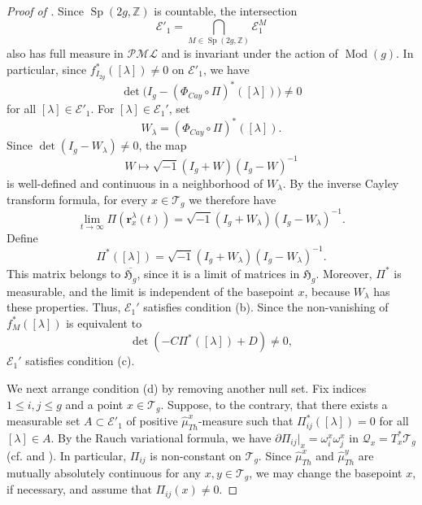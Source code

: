 \documentclass[dvipdfmx]{amsart}
\theoremstyle{remark}
\newcommand{\teich}{\mathcal{T}}
\newcommand{\tmod}{\operatorname{Mod}}
\newcommand{\PThursM}{\hat{\mu}_{Th}}
\newcommand{\ray}{{\boldsymbol r}}
\newcommand{\pml}{\mathcal{PML}}
\newcommand{\syp}{\mathop{Sp}}
\newcommand{\Cayley}{\Phi_{C\!a\!y}}
\begin{document}
\begin{proof}[Proof of ]
Since $\syp(2g,\mathbb{Z})$ is countable, the intersection
\[
\mathcal{E}'_1
=
\bigcap_{M\in \syp(2g,\mathbb{Z})}\mathcal{E}_1^M
\]
also has full measure in $\pml$ and is invariant under the action of $\tmod(g)$.
In particular, since $f_{I_{2g}}^*([\lambda])\ne 0$ on $\mathcal{E}'_1$, we have
\[
\det\bigl(I_g-(\Cayley\circ\Pi)^*([\lambda])\bigr)\ne 0
\]
for all $[\lambda]\in \mathcal{E}'_1$.
For $[\lambda]\in\mathcal{E}_1'$, set
\[
W_\lambda=(\Cayley\circ\Pi)^*([\lambda]).
\]
Since $\det(I_g-W_\lambda)\ne0$, the map
\[
W\longmapsto
\sqrt{-1}(I_g+W)(I_g-W)^{-1}
\]
is well-defined and continuous in a neighborhood of $W_\lambda$.
By the inverse Cayley transform formula, for every
$x\in\teich_g$ we therefore have
\[
\lim_{t\to\infty}\Pi(\ray^\lambda_x(t))
=
\sqrt{-1}(I_g+W_\lambda)(I_g-W_\lambda)^{-1}.
\]
Define
\[
\Pi^*([\lambda])
=
\sqrt{-1}(I_g+W_\lambda)(I_g-W_\lambda)^{-1}.
\]
This matrix belongs to $\overline{\mathfrak H_g}$, since it is
a limit of matrices in $\mathfrak H_g$.
Moreover, $\Pi^*$ is measurable, and the limit is independent
of the basepoint $x$, because $W_\lambda$ has these properties.
Thus, $\mathcal E_1'$ satisfies condition (b).
Since the non-vanishing of $f_M^*([\lambda])$ is equivalent to
\[
\det(-C\Pi^*([\lambda])+D)\ne 0,
\]
$\mathcal{E}_1'$ satisfies condition (c).

We next arrange condition (d) by removing another null set.
Fix indices $1\le i,j\le g$ and a point $x\in \teich_g$.
Suppose, to the contrary, that there exists a measurable set
$A\subset \mathcal{E}'_1$ of positive $\PThursM^x$-measure such that
$\Pi^*_{ij}([\lambda])=0$ for all $[\lambda]\in A$.
By the Rauch variational formula, we have
$\partial \Pi_{ij}|_x=\omega^x_i\omega^x_j$ in $\mathcal{Q}_x=T^*_x\teich_g$
(cf. \cite{Ahlfors1960} and \cite{Rauch1965}).
In particular, $\Pi_{ij}$ is non-constant on $\teich_g$.
Since $\PThursM^x$ and $\PThursM^y$ are mutually absolutely continuous for any
$x,y\in \teich_g$, we may change the basepoint $x$, if necessary, and assume that
$\Pi_{ij}(x)\ne 0$.


\end{proof}
\end{document}
